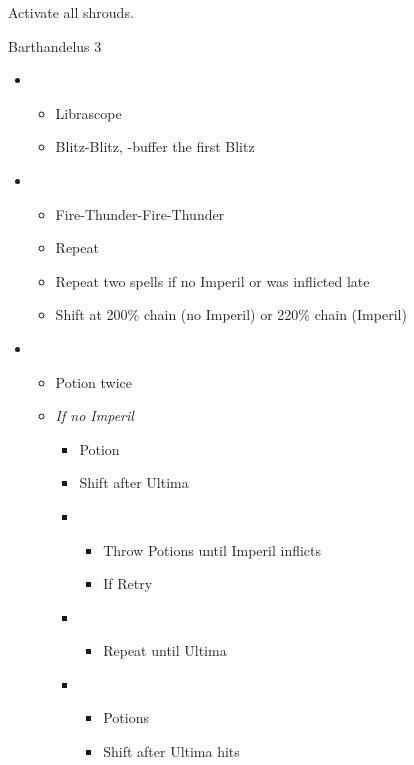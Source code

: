 Activate all shrouds.

\begin{battle}{Barthandelus 3}
\begin{multicols}{2}
\begin{itemize}
    \item \second
    \begin{itemize}
        \item Librascope
        \item Blitz-Blitz, \rav-buffer the first Blitz
    \end{itemize}
    \item \fifth
    \begin{itemize}
        \item Fire-Thunder-Fire-Thunder
        \item Repeat
        \item Repeat two spells if no Imperil or was inflicted late
        \item Shift at 200\% chain (no Imperil) or 220\% chain (Imperil)
    \end{itemize}
    \item \third
    \begin{itemize}
        \item Potion twice
        \item \textit{If no Imperil}
        \begin{itemize}
            \item Potion
            \item Shift after Ultima
            \item \fifth
            \begin{itemize}
                \item Throw Potions until Imperil inflicts
                \item If \stagger Retry
            \end{itemize}
            \item \first
            \begin{itemize}
                \item Repeat until Ultima
            \end{itemize}
            \item \third
            \begin{itemize}
                \item Potions
                \item Shift after Ultima hits
            \end{itemize}

\end{itemize}
\end{itemize}
\end{itemize}
\end{multicols}
\end{battle}
